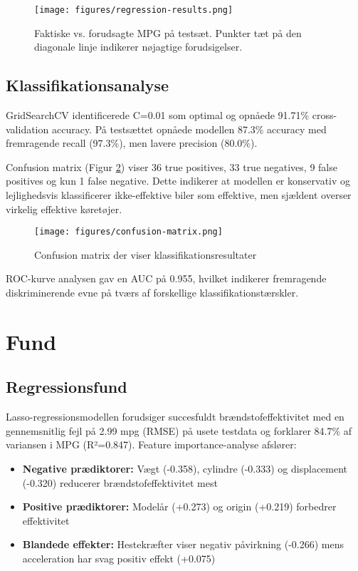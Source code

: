 \documentclass[a4paper, twocolumn]{article}
\begin{document}
\begin{figure}[h]
    \centering
    \texttt{[image: figures/regression-results.png]}
    \caption{Faktiske vs. forudsagte MPG på testsæt. Punkter tæt på den diagonale linje indikerer nøjagtige forudsigelser.}
    \label{fig:regression}
\end{figure}

\subsection{Klassifikationsanalyse}
GridSearchCV identificerede C=0.01 som optimal og opnåede 91.71\% cross-validation accuracy. På testsættet opnåede modellen 87.3\% accuracy med fremragende recall (97.3\%), men lavere precision (80.0\%).

Confusion matrix (Figur \ref{fig:confusion}) viser 36 true positives, 33 true negatives, 9 false positives og kun 1 false negative. Dette indikerer at modellen er konservativ og lejlighedsvis klassificerer ikke-effektive biler som effektive, men sjældent overser virkelig effektive køretøjer.

\begin{figure}[h]
    \centering
    \texttt{[image: figures/confusion-matrix.png]}
    \caption{Confusion matrix der viser klassifikationsresultater}
    \label{fig:confusion}
\end{figure}

ROC-kurve analysen gav en AUC på 0.955, hvilket indikerer fremragende diskriminerende evne på tværs af forskellige klassifikationstærskler.

\section{Fund}
\label{sec:findings}

\subsection{Regressionsfund}
Lasso-regressionsmodellen forudsiger succesfuldt brændstofeffektivitet med en gennemsnitlig fejl på 2.99 mpg (RMSE) på usete testdata og forklarer 84.7\% af variansen i MPG (R²=0.847). Feature importance-analyse afslører:

\begin{itemize}
\item \textbf{Negative prædiktorer:} Vægt (-0.358), cylindre (-0.333) og displacement (-0.320) reducerer brændstofeffektivitet mest
\item \textbf{Positive prædiktorer:} Modelår (+0.273) og origin (+0.219) forbedrer effektivitet
\item \textbf{Blandede effekter:} Hestekræfter viser negativ påvirkning (-0.266) mens acceleration har svag positiv effekt (+0.075)
\end{itemize}
\end{document}
